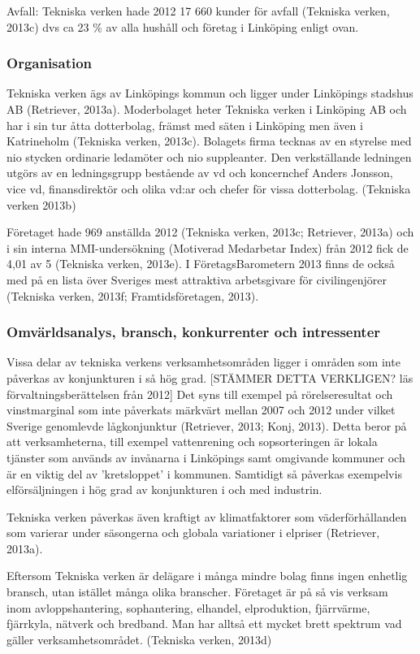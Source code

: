 \documentclass[10pt,a4paper]{article}
\begin{document}
Avfall: Tekniska verken hade 2012 17 660 kunder för avfall (Tekniska verken, 2013c) dvs ca 23 \% av alla hushåll och företag i Linköping enligt ovan. 

\subsubsection{Organisation}
Tekniska verken ägs av Linköpings kommun och ligger under Linköpings stadshus AB (Retriever, 2013a). Moderbolaget heter Tekniska verken i Linköping AB och har i sin tur åtta dotterbolag, främst med säten i Linköping men även i Katrineholm (Tekniska verken, 2013c).  Bolagets firma tecknas av en styrelse med nio stycken ordinarie ledamöter och nio suppleanter. Den verkställande ledningen utgörs av en ledningsgrupp bestående av vd och koncernchef Anders Jonsson, vice vd, finansdirektör och olika vd:ar och chefer för vissa dotterbolag. (Tekniska verken 2013b)

Företaget hade 969 anställda 2012 (Tekniska verken, 2013c; Retriever, 2013a) och i sin interna MMI-undersökning (Motiverad Medarbetar Index) från 2012 fick de 4,01 av 5 (Tekniska verken, 2013e). I FöretagsBarometern 2013 finns de också med på en lista över Sveriges mest attraktiva arbetsgivare för civilingenjörer (Tekniska verken, 2013f; Framtidsföretagen, 2013). 

\subsubsection{Omvärldsanalys, bransch, konkurrenter och intressenter}
Vissa delar av tekniska verkens verksamhetsområden ligger i områden som inte
påverkas av konjunkturen i så hög grad. [STÄMMER DETTA VERKLIGEN? läs förvaltningsberättelsen från 2012] 
Det syns till exempel på rörelseresultat och vinstmarginal som inte 
påverkats märkvärt mellan 2007 och 2012 under vilket Sverige genomlevde 
lågkonjunktur (Retriever, 2013; Konj, 2013). Detta beror på att verksamheterna, 
till exempel vattenrening och sopsorteringen är lokala tjänster som används av 
invånarna i Linköpings samt omgivande kommuner och är en viktig del av 'kretsloppet' i kommunen.
Samtidigt så påverkas exempelvis elförsäljningen i hög grad av konjunkturen i
och med industrin.

Tekniska verken påverkas även kraftigt av klimatfaktorer som väderförhållanden 
som varierar under säsongerna och globala variationer i elpriser (Retriever, 2013a).


Eftersom Tekniska verken är delägare i många mindre bolag finns ingen enhetlig 
bransch, utan istället många olika branscher. Företaget är på så vis verksam inom
avloppshantering, sophantering, elhandel, elproduktion, fjärrvärme, fjärrkyla, 
nätverk och bredband. Man har alltså ett mycket brett spektrum vad gäller 
verksamhetsområdet. (Tekniska verken, 2013d)
\end{document}
